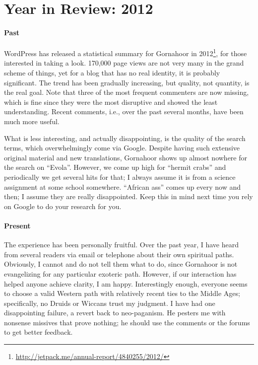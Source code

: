 \section{Year in Review: 2012}

\paragraph{Past}


WordPress has released a statistical summary for Gornahoor in 2012\footnote{\url{http://jetpack.me/annual-report/4840255/2012/}}, for those interested in taking a look. 170,000 page views are not very many in the grand scheme of things, yet for a blog that has no real identity, it is probably significant. The trend has been gradually increasing, but quality, not quantity, is the real goal. Note that three of the most frequent commenters are now missing, which is fine since they were the most disruptive and showed the least understanding. Recent comments, i.e., over the past several months, have been much more useful.

What is less interesting, and actually disappointing, is the quality of the search terms, which overwhelmingly come via Google. Despite having such extensive original material and new translations, Gornahoor shows up almost nowhere for the search on ``Evola''. However, we come up high for ``hermit crabs'' and periodically we get several hits for that; I always assume it is from a science assignment at some school somewhere. ``African ass'' comes up every now and then; I assume they are really disappointed. Keep this in mind next time you rely on Google to do your research for you.

\paragraph{Present}


The experience has been personally fruitful. Over the past year, I have heard from several readers via email or telephone about their own spiritual paths. Obviously, I cannot and do not tell them what to do, since Gornahoor is not evangelizing for any particular exoteric path. However, if our interaction has helped anyone achieve clarity, I am happy. Interestingly enough, everyone seems to choose a valid Western path with relatively recent ties to the Middle Ages; specifically, no Druids or Wiccans trust my judgment. I have had one disappointing failure, a revert back to neo-paganism. He pesters me with nonsense missives that prove nothing; he should use the comments or the forums to get better feedback.

